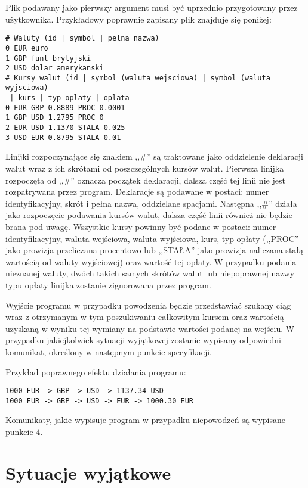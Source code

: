 \documentclass[a4paper,11pt]{article}
\begin{document}
Plik podawany jako pierwszy argument musi być uprzednio przygotowany przez użytkownika. Przykładowy poprawnie zapisany plik znajduje się poniżej:
 
\begin{lstlisting}
# Waluty (id | symbol | pelna nazwa)
0 EUR euro
1 GBP funt brytyjski
2 USD dolar amerykanski
# Kursy walut (id | symbol (waluta wejsciowa) | symbol (waluta wyjsciowa)
 | kurs | typ oplaty | oplata
0 EUR GBP 0.8889 PROC 0.0001
1 GBP USD 1.2795 PROC 0
2 EUR USD 1.1370 STALA 0.025
3 USD EUR 0.8795 STALA 0.01
\end{lstlisting}

Linijki rozpoczynające się znakiem ,,\#'' są traktowane jako oddzielenie deklaracji walut wraz z ich skrótami od poszczególnych kursów walut. Pierwsza linijka rozpoczęta od ,,\#'' oznacza początek deklaracji, dalsza część tej linii nie jest rozpatrywana przez program. Deklaracje są podawane w postaci: numer identyfikacyjny, skrót i pełna nazwa, oddzielane spacjami. Następna ,,\#'' działa jako rozpoczęcie podawania kursów walut, dalsza część linii również nie będzie brana pod uwagę. Wszystkie kursy powinny być podane w postaci: numer identyfikacyjny, waluta wejściowa, waluta wyjściowa, kurs, typ opłaty (,,PROC'' jako prowizja przeliczana procentowo lub ,,STAŁA'' jako prowizja naliczana stałą wartością od waluty wyjściowej) oraz wartość tej opłaty. W przypadku podania nieznanej waluty, dwóch takich samych skrótów walut lub niepoprawnej nazwy typu opłaty linijka zostanie zignorowana przez program.

Wyjście programu w przypadku powodzenia będzie przedstawiać szukany ciąg wraz z otrzymanym w tym poszukiwaniu całkowitym kursem oraz wartością uzyskaną w wyniku tej wymiany na podstawie wartości podanej na wejściu. W przypadku jakiejkolwiek sytuacji wyjątkowej zostanie wypisany odpowiedni komunikat, określony w następnym punkcie specyfikacji.

Przykład poprawnego efektu działania programu:
\begin{lstlisting}
1000 EUR -> GBP -> USD -> 1137.34 USD
1000 EUR -> GBP -> USD -> EUR -> 1000.30 EUR
\end{lstlisting}

Komunikaty, jakie wypisuje program w przypadku niepowodzeń są wypisane punkcie 4.


\section{Sytuacje wyjątkowe}
\end{document}
